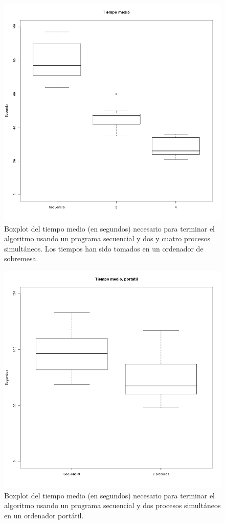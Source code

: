 \documentclass{article}
\begin{document}

\begin{figure}[!htb]
\centering
\includegraphics[scale=0.45]{tiempos.png}
\caption{Boxplot del tiempo medio (en segundos) necesario para
  terminar el algoritmo usando un programa secuencial y dos y cuatro
  procesos simultáneos.  Los tiempos han sido tomados en un ordenador
  de sobremesa. \label{fig:sm}}
\end{figure} 
%
\begin{figure}[!htb]
\centering
\includegraphics[scale=0.45]{tiempos-toshiba.png}
\caption{Boxplot del tiempo medio (en segundos) necesario para
  terminar el algoritmo usando un programa secuencial y dos 
  procesos simultáneos en un ordenador portátil.  \label{fig:toshiba}}
\end{figure} 
\end{document}
